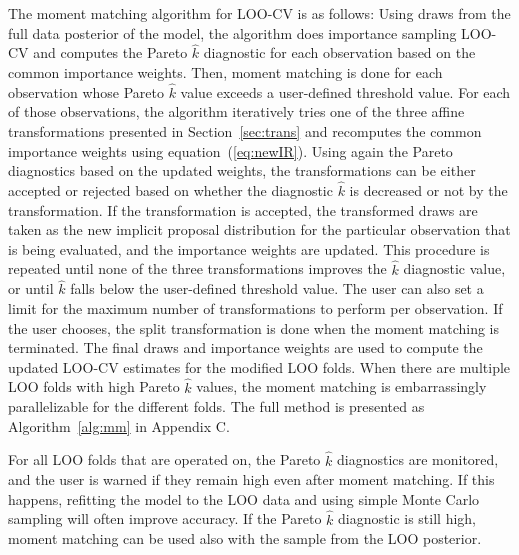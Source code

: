 \documentclass[12pt]{article}
\begin{document}
The moment matching algorithm for LOO-CV is as follows:
Using draws from the full data posterior of the model, the algorithm does importance sampling
LOO-CV and computes the Pareto $\hat{k}$ diagnostic for each observation
based on the common importance weights.
Then, moment matching is done for each observation whose Pareto $\hat{k}$ value exceeds
a user-defined threshold value.
For each of those observations, the algorithm iteratively tries one of the three affine transformations
presented in Section~\ref{sec:trans} and recomputes the common importance weights using equation~(\ref{eq:newIR}).
Using again the Pareto diagnostics based on the updated weights, the transformations can be either accepted or rejected
based on whether the diagnostic $\hat{k}$ is decreased or not by the transformation.
%
If the transformation is accepted, the transformed draws are
taken as the new implicit proposal distribution for the particular observation that
is being evaluated, and the importance weights are updated.
This procedure is repeated until none of the three transformations improves the $\hat{k}$ diagnostic value, or
until $\hat{k}$ falls below the user-defined threshold value.
The user can also set a limit for the maximum number of transformations to
perform per observation. If the user chooses, the split transformation
is done when the moment matching is terminated. The final draws and importance weights are used to compute the
updated LOO-CV estimates for the modified LOO folds.
When there are multiple LOO folds with high Pareto $\hat{k}$ values, the moment matching
is embarrassingly parallelizable for the different folds.
The full method is presented as Algorithm~\ref{alg:mm} in Appendix C.


For all LOO folds that are operated on, the Pareto $\hat{k}$ diagnostics
are monitored, and the user is warned if they remain high even after moment matching.
If this happens, refitting the model to the LOO data
and using simple Monte Carlo sampling will often improve
accuracy. If the Pareto $\hat{k}$ diagnostic is still high,
moment matching can be used also with the sample from the LOO posterior.
\end{document}
